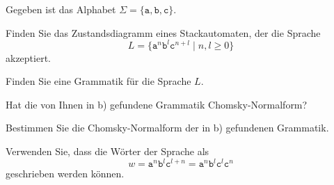 Gegeben ist das Alphabet $\Sigma=\{\texttt{a},\texttt{b},\texttt{c}\}$.
\begin{teilaufgaben}
\item
Finden Sie das Zustandsdiagramm eines Stackautomaten, der die Sprache
\[
L
=
\{ \texttt{a}^n \texttt{b}^l \texttt{c}^{n+l}\;|\; n,l\ge 0\}
\]
akzeptiert.
\item
Finden Sie eine Grammatik für die Sprache $L$.
\item
Hat die von Ihnen in b) gefundene Grammatik Chomsky-Normalform?
\item 
Bestimmen Sie die Chomsky-Normalform der in b) gefundenen Grammatik.
\end{teilaufgaben}


\begin{hinweis}
Verwenden Sie, dass die Wörter der Sprache als
\[
w
=
\texttt{a}^n \texttt{b}^l \texttt{c}^{l+n}
=
\texttt{a}^n \texttt{b}^l \texttt{c}^{l} \texttt{c}^{n}
\]
geschrieben werden können.
\end{hinweis}

